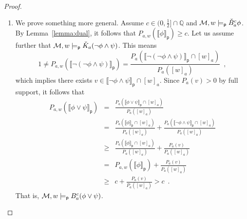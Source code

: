 \documentclass[12pt]{article}
\theoremstyle{definition}
\newcommand{\Rat}{\mathbb{Q}}  %
\newcommand{\M}{{\cal M}}      %
\newcommand{\modelsp}{\models_{\mathsf{p}}}                  %
\newcommand{\semp}[1]{\llbracket{#1}\rrbracket_{\mathsf{p}}} %
\begin{document}
\begin{proof}
\begin{enumerate}
  \item We prove something more general. 
    Assume $c\in(0,\frac 12]\cap\Rat$ and $\M,w\modelsp\check B^c_a\phi$.  By
    Lemma~\ref{lemma:dual}, it follows that
    $P_{a,w}(\semp{\phi})\geq c$.  Let us assume further that
    $\M,w\modelsp\check K_a(\lnot\phi\land\psi)$.  This means
    \[
    1\neq P_{a,w}(\semp{\lnot(\lnot\phi\land\psi)})=
    \frac{P_a(\semp{\lnot(\lnot\phi\land\psi)}\cap[w]_a)}{P_a([w]_a)}
    \enspace,
    \]
    which implies there exists $v\in
    \semp{\lnot\phi\land\psi}\cap[w]_a$.  Since $P_a(v)>0$ by full support, it follows that
    \begin{eqnarray*}
    P_{a,w}(\semp{\phi\lor\psi}) &=&
    \frac{ P_a(\semp{\phi\lor\psi}\cap [w]_a) }{ P_a([w]_a) }
    \\
    &=&
    \frac{ P_a(\semp{\phi}\cap [w]_a) }{ P_a([w]_a) } +
    \frac{ P_a(\semp{\lnot\phi\land\psi}\cap [w]_a) }{ P_a([w]_a) }
    \\
    &\geq&
    \frac{ P_a(\semp{\phi}\cap[w]_a) }{P_a([w]_a)} + \frac{ P_a(v) }{P_a([w]_a)}
    \\
    &=&
    P_{a,w}(\semp{\phi})+\frac{ P_a(v) }{P_a([w]_a)}
    \\
    &\geq&
    c + \frac{ P_a(v) }{P_a([w]_a)}
    > c\enspace.
    \end{eqnarray*}
    That is,
    $\M,w\modelsp B_a^c(\phi\lor\psi)$.


\end{enumerate}
\end{proof}
\end{document}
